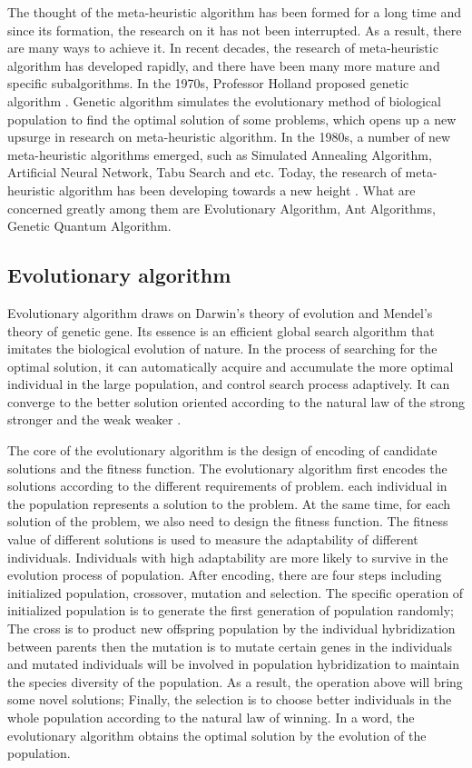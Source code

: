 The thought of the meta-heuristic algorithm has been formed for a long time 
and since its formation, the research on it has not been interrupted. As a 
result, there are many ways to achieve it. In recent decades, the research of 
meta-heuristic algorithm has developed rapidly, and there have been many more 
mature and specific subalgorithms. In the 1970s, Professor Holland proposed 
genetic algorithm \cite{holland}. Genetic algorithm simulates the 
evolutionary method of biological population to find the optimal solution of 
some problems, which opens up a new upsurge in research on meta-heuristic 
algorithm. In the 1980s, a number of new meta-heuristic algorithms emerged, 
such as Simulated Annealing Algorithm, Artificial Neural Network, Tabu Search 
and etc. Today, the research of meta-heuristic algorithm has been developing 
towards a new height \cite{harman}. What are concerned greatly among them are 
Evolutionary Algorithm, Ant Algorithms, Genetic Quantum Algorithm.

\subsection{Evolutionary algorithm}

Evolutionary algorithm draws on Darwin's theory of evolution and Mendel's 
theory of genetic gene. Its essence is an efficient global search algorithm 
that imitates the biological evolution of nature. In the process of searching 
for the optimal solution, it can automatically acquire and accumulate the 
more optimal individual in the large population, and control search process 
adaptively. It can converge to the better solution oriented according to the 
natural law of the strong stronger and the weak weaker \cite{deb}.


The core of the evolutionary algorithm is the design of encoding of candidate
solutions and the fitness function. The evolutionary algorithm first encodes the
solutions according to the different requirements of problem. each individual in
the population represents a solution to the problem. At the same time, for each
solution of the problem, we also need to design the fitness function. The
fitness value of different solutions is used to measure the adaptability of
different individuals. Individuals with high adaptability are more likely to
survive in the evolution process of population. After encoding, there are four
steps including initialized population, crossover, mutation and selection. The
specific operation of initialized population is to generate the first generation
of population randomly; The cross is to product new offspring population by the
individual hybridization between parents then the mutation is to mutate certain
genes in the individuals and mutated individuals will be involved in population
hybridization to maintain the species diversity of the population. As a result,
the operation above will bring some novel solutions; Finally, the selection is
to choose better individuals in the whole population according to the natural
law of winning.  In a word, the evolutionary algorithm obtains the optimal
solution by the evolution of the population.



